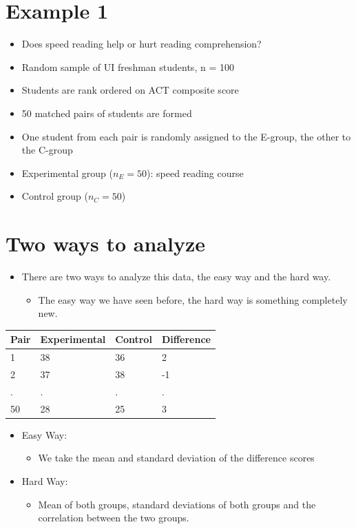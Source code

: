 \documentclass[12pt]{article}
\begin{document}
\section{Example 1}\label{example-1}

\begin{itemize}
\itemsep1pt\parskip0pt
\item
  Does speed reading help or hurt reading comprehension?
\item
  Random sample of UI freshman students, n = 100
\item
  Students are rank ordered on ACT composite score
\item
  50 matched pairs of students are formed
\item
  One student from each pair is randomly assigned to the E-group, the
  other to the C-group
\item
  Experimental group (\(n_{E} = 50\)): speed reading course
\item
  Control group (\(n_{C} = 50\))
\end{itemize}

\section{Two ways to analyze}\label{two-ways-to-analyze}

\begin{itemize}
\itemsep1pt\parskip0pt
\item
  There are two ways to analyze this data, the easy way and the hard
  way.

  \begin{itemize}
  \itemsep1pt\parskip0pt
  \item
    The easy way we have seen before, the hard way is something
    completely new.
  \end{itemize}
\end{itemize}

\begin{longtable}[c]{@{}llll@{}}
\toprule
Pair & Experimental & Control & Difference\tabularnewline
\midrule
\endhead
1 & 38 & 36 & 2\tabularnewline
2 & 37 & 38 & -1\tabularnewline
. & . & . & .\tabularnewline
50 & 28 & 25 & 3\tabularnewline
\bottomrule
\end{longtable}

\begin{itemize}
\itemsep1pt\parskip0pt
\item
  Easy Way:

  \begin{itemize}
  \itemsep1pt\parskip0pt
  \item
    We take the mean and standard deviation of the difference scores
  \end{itemize}
\item
  Hard Way:

  \begin{itemize}
  \itemsep1pt\parskip0pt
  \item
    Mean of both groups, standard deviations of both groups and the
    correlation between the two groups.
  \end{itemize}
\end{itemize}
\end{document}
